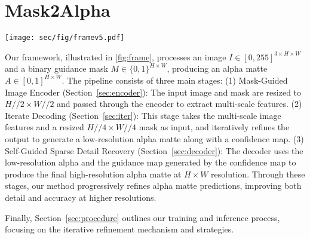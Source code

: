 \section{Mask2Alpha}
\begin{figure*}[t]
    \centering \texttt{[image: sec/fig/framev5.pdf]}
    \caption{\textbf{The Pipeline of our Mask2Alpha.}The process begins with the Input Image and Initial Mask, which are processed by the Mask-Guided Image Encoder to extract multi-scale features guided by semantic regions. These features are then passed to the Iterative Decoding stage, where alpha mattes are progressively refined over multiple iterations. Finally, the  Self-Guided Sparse Detail Recovery stage uses adaptive fusion with confidence-weighted feature maps to output the final refined alpha matte with enhanced high-resolution detail and precision.}
    \label{fig:frame}
\end{figure*}

Our framework, illustrated in \cref{fig:frame}, processes an image \( I \in [0, 255]^{3 \times H \times W} \) and a binary guidance mask \( M \in \{0, 1\}^{H \times W} \), producing an alpha matte \( A \in [0, 1]^{H\times W} \). The pipeline consists of three main stages: (1) Mask-Guided Image Encoder (Section~\ref{sec:encoder}): The input image and mask are resized to \( H // 2 \times W // 2 \) and passed through the encoder to extract multi-scale features. (2) Iterate Decoding (Section~\ref{sec:iter}): This stage takes the multi-scale image features and a resized \( H // 4 \times W // 4 \) mask as input, and iteratively refines the output to generate a low-resolution alpha matte along with a confidence map. (3) Self-Guided Sparse Detail Recovery (Section~\ref{sec:decoder}): The decoder uses the low-resolution alpha and the guidance map generated by the confidence map to produce the final high-resolution alpha matte at \( H \times W \) resolution. Through these stages, our method progressively refines alpha matte predictions, improving both detail and accuracy at higher resolutions.

Finally, Section~\ref{sec:procedure} outlines our training and inference process, focusing on the iterative refinement mechanism and strategies. 




